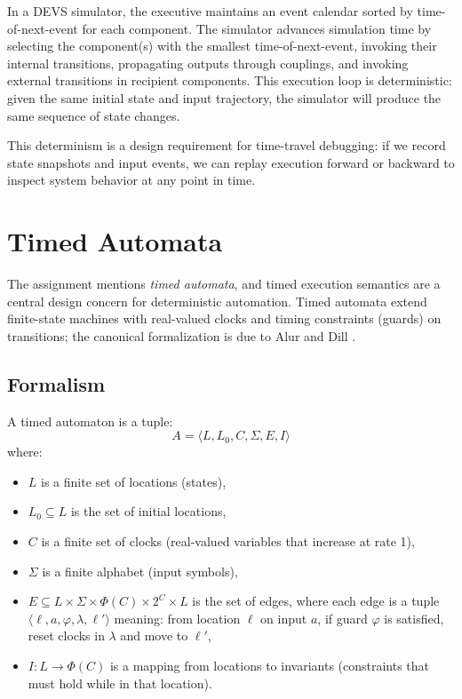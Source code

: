 In a DEVS simulator, the executive maintains an event calendar sorted by time-of-next-event for each component.
The simulator advances simulation time by selecting the component(s) with the smallest time-of-next-event, invoking their internal transitions, propagating outputs through couplings, and invoking external transitions in recipient components.
This execution loop is deterministic: given the same initial state and input trajectory, the simulator will produce the same sequence of state changes.

This determinism is a design requirement for time-travel debugging: if we record state snapshots and input events, we can replay execution forward or backward to inspect system behavior at any point in time.

\section{Timed Automata}

The assignment mentions \emph{timed automata}, and timed execution semantics are a central design concern for deterministic automation.
Timed automata extend finite-state machines with real-valued clocks and timing constraints (guards) on transitions; the canonical formalization is due to Alur and Dill \cite{AlurDillTA}.

\subsection{Formalism}

A timed automaton is a tuple:
\[
A = \langle L, L_0, C, \Sigma, E, I \rangle
\]
where:
\begin{itemize}
  \item $L$ is a finite set of locations (states),
  \item $L_0 \subseteq L$ is the set of initial locations,
  \item $C$ is a finite set of clocks (real-valued variables that increase at rate 1),
  \item $\Sigma$ is a finite alphabet (input symbols),
  \item $E \subseteq L \times \Sigma \times \Phi(C) \times 2^C \times L$ is the set of edges, where each edge is a tuple $\langle \ell, a, \varphi, \lambda, \ell' \rangle$ meaning: from location $\ell$ on input $a$, if guard $\varphi$ is satisfied, reset clocks in $\lambda$ and move to $\ell'$,
  \item $I: L \rightarrow \Phi(C)$ is a mapping from locations to invariants (constraints that must hold while in that location).
\end{itemize}

